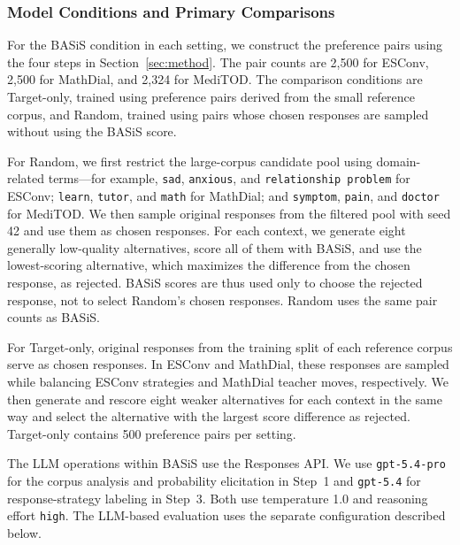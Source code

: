 \documentclass[manuscript,review,anonymous]{acmart}
\begin{document}
\subsubsection{Model Conditions and Primary Comparisons}

For the BASiS condition in each setting, we construct the preference pairs using the four steps in Section~\ref{sec:method}. The pair counts are 2,500 for ESConv, 2,500 for MathDial, and 2,324 for MediTOD. The comparison conditions are Target-only, trained using preference pairs derived from the small reference corpus, and Random, trained using pairs whose chosen responses are sampled without using the BASiS score.

For Random, we first restrict the large-corpus candidate pool using domain-related terms---for example, \texttt{sad}, \texttt{anxious}, and \texttt{relationship problem} for ESConv; \texttt{learn}, \texttt{tutor}, and \texttt{math} for MathDial; and \texttt{symptom}, \texttt{pain}, and \texttt{doctor} for MediTOD. We then sample original responses from the filtered pool with seed 42 and use them as chosen responses. For each context, we generate eight generally low-quality alternatives, score all of them with BASiS, and use the lowest-scoring alternative, which maximizes the difference from the chosen response, as rejected. BASiS scores are thus used only to choose the rejected response, not to select Random's chosen responses. Random uses the same pair counts as BASiS.

For Target-only, original responses from the training split of each reference corpus serve as chosen responses. In ESConv and MathDial, these responses are sampled while balancing ESConv strategies and MathDial teacher moves, respectively. We then generate and rescore eight weaker alternatives for each context in the same way and select the alternative with the largest score difference as rejected. Target-only contains 500 preference pairs per setting.

The LLM operations within BASiS use the Responses API. We use \texttt{gpt-5.4-pro} for the corpus analysis and probability elicitation in Step~1 and \texttt{gpt-5.4} for response-strategy labeling in Step~3. Both use temperature 1.0 and reasoning effort \texttt{high}. The LLM-based evaluation uses the separate configuration described below.
\end{document}
